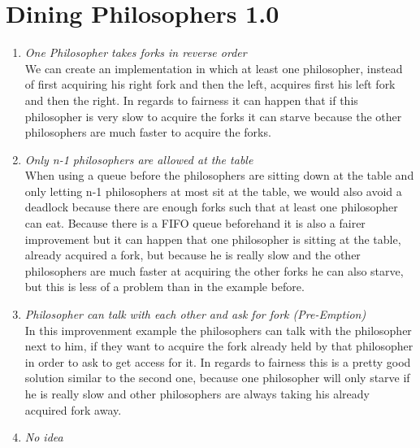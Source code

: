 \documentclass{report}
\begin{document}
	\section{Dining Philosophers 1.0}
	\startsection
		\begin{enumerate}
			\item \textit{One Philosopher takes forks in reverse order} \\
			We can create an implementation in which at least one philosopher, instead of first acquiring his right fork and then the left, acquires first his left fork and then the right. In regards to fairness it can happen that if this philosopher is very slow to acquire the forks it can starve because the other philosophers are much faster to acquire the forks.
			\item \textit{Only n-1 philosophers are allowed at the table} \\
			When using a queue before the philosophers are sitting down at the table and only letting n-1 philosophers at most sit at the table, we would also avoid a deadlock because there are enough forks such that at least one philosopher can eat. Because there is a FIFO queue beforehand it is also a fairer improvement but it can happen that one philosopher is sitting at the table, already acquired a fork, but because he is really slow and the other philosophers are much faster at acquiring the other forks he can also starve, but this is less of a problem than in the example before.
			\item \textit{Philosopher can talk with each other and ask for fork (Pre-Emption)} \\
			In this improvenment example the philosophers can talk with the philosopher next to him, if they want to acquire the fork already held by that philosopher in order to ask to get access for it. In regards to fairness this is a pretty good solution similar to the second one, because one philosopher will only starve if he is really slow and other philosophers are always taking his already acquired fork away.
			\item \textit{No idea} \\
		\end{enumerate}
	\closesection
	
\end{document}
